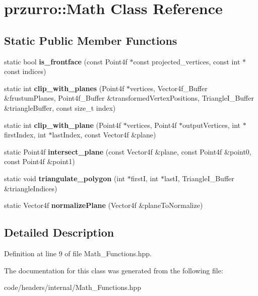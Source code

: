\hypertarget{classprzurro_1_1_math}{}\section{przurro\+::Math Class Reference}
\label{classprzurro_1_1_math}
\subsection*{Static Public Member Functions}
\begin{DoxyCompactItemize}
\item 
\mbox{\label{classprzurro_1_1_math_ab79d11d1f4cce9d6a88776ff8bf41ab8}} 
static bool {\bfseries is\+\_\+frontface} (const Point4f $\ast$const projected\+\_\+vertices, const int $\ast$const indices)
\item 
\mbox{\label{classprzurro_1_1_math_aecd96366dea9e426f912bf3b5f347ef5}} 
static int {\bfseries clip\+\_\+with\+\_\+planes} (Point4f $\ast$vertices, Vector4f\+\_\+\+Buffer \&frustum\+Planes, Point4f\+\_\+\+Buffer \&transformed\+Vertex\+Positions, Triangle\+I\+\_\+\+Buffer \&triangle\+Buffer, const size\+\_\+t index)
\item 
\mbox{\label{classprzurro_1_1_math_a143e72468332eda80c87b30cba4bc102}} 
static int {\bfseries clip\+\_\+with\+\_\+plane} (Point4f $\ast$vertices, Point4f $\ast$output\+Vertices, int $\ast$first\+Index, int $\ast$last\+Index, const Vector4f \&plane)
\item 
\mbox{\label{classprzurro_1_1_math_a1ac9489540cc0131b199be7f6b81ba77}} 
static Point4f {\bfseries intersect\+\_\+plane} (const Vector4f \&plane, const Point4f \&point0, const Point4f \&point1)
\item 
\mbox{\label{classprzurro_1_1_math_a93e0f2631b7f7e3a16a9a033ce57df0b}} 
static void {\bfseries triangulate\+\_\+polygon} (int $\ast$firstI, int $\ast$lastI, Triangle\+I\+\_\+\+Buffer \&triangle\+Indices)
\item 
\mbox{\label{classprzurro_1_1_math_af5ce88f7b215010b21daecf82c671428}} 
static Vector4f {\bfseries normalize\+Plane} (Vector4f \&plane\+To\+Normalize)
\end{DoxyCompactItemize}


\subsection{Detailed Description}


Definition at line 9 of file Math\+\_\+\+Functions.\+hpp.



The documentation for this class was generated from the following file\+:\begin{DoxyCompactItemize}
\item 
code/headers/internal/Math\+\_\+\+Functions.\+hpp\end{DoxyCompactItemize}
